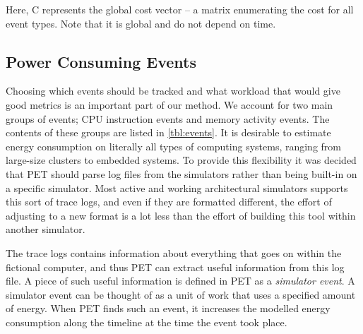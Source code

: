 Here, C represents the global cost vector -- a matrix enumerating the cost
for all event types. Note that it is global and do not depend on time.

\subsection{Power Consuming Events}
\label{subsec:powerevents}

Choosing which events should be tracked and what workload that would give good
metrics is an important part of our method. We account for two main groups of
events; CPU instruction events and memory activity events. The contents of these
groups are listed in \autoref{tbl:events}. It is desirable to estimate energy
consumption on literally all types of computing systems, ranging from large-size
clusters to embedded systems. To provide this flexibility it was decided that
PET should parse log files from the simulators rather than being built-in on a
specific simulator. Most active and working architectural simulators supports this
sort of trace logs, and even if they are formatted different, the effort of
adjusting to a new format is a lot less than the effort of building this tool
within another simulator.

The trace logs contains information about everything that goes on within the
fictional computer, and thus PET can extract useful information from this log
file. A piece of such useful information is defined in PET as a \emph{simulator
event}. A simulator event can be thought of as a unit of work that uses a
specified amount of energy. When PET finds such an event, it increases the
modelled energy consumption along the timeline at the time the event took place.

